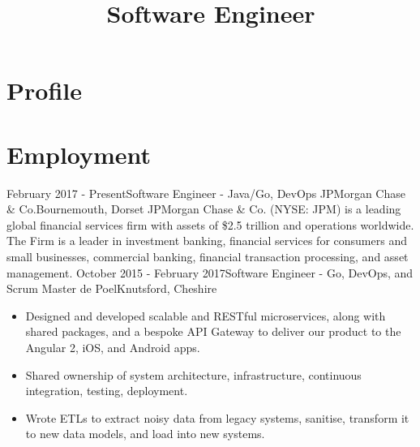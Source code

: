 \documentclass[11pt,a4paper]{moderncv}
\title{Software Engineer}
\begin{document}
	\maketitle

	\vspace{-3.5em}

	\section{Profile}

	\section{Employment}
		\cventry
			{February 2017 - Present}{Software Engineer - Java/Go, DevOps}
			{JPMorgan Chase \& Co.}{Bournemouth, Dorset}
			{}{
            JPMorgan Chase \& Co. (NYSE: JPM) is a leading global financial services firm with assets of \$2.5 trillion and operations worldwide.
            The Firm is a leader in investment banking, financial services for consumers and small businesses, commercial banking, financial transaction processing, and asset management.
				\vspace{.25em}
			}
		\cventry
			{October 2015 - February 2017}{Software Engineer - Go, DevOps, and Scrum Master}
			{de Poel}{Knutsford, Cheshire}
			{}{
				\vspace{.25em}
				\vspace{.1em}
				\begin{itemize}
					\item Designed and developed scalable and RESTful microservices, along with shared packages, and a bespoke API Gateway to deliver our product to the Angular 2, iOS, and Android apps.
					\item Shared ownership of system architecture, infrastructure, continuous integration, testing, deployment.
					\item Wrote ETLs to extract noisy data from legacy systems, sanitise, transform it to new data models, and load into new systems.
				\end{itemize}
				\vspace{.25em}
			}
\end{document}

